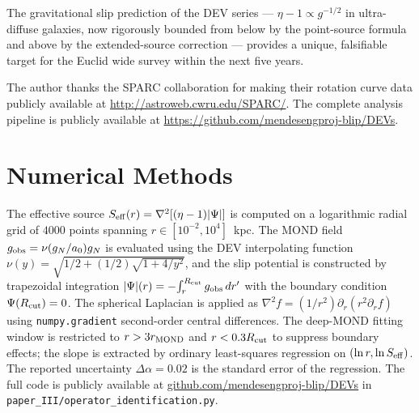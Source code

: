 \documentclass[aps,prd,twocolumn,superscriptaddress,nofootinbib]{revtex4-2}
\newcommand{\aO}{a_0}
\begin{document}
The gravitational slip prediction of the DEV series ---
$\eta-1 \propto g^{-1/2}$ in ultra-diffuse galaxies,
now rigorously bounded from below by the point-source
formula and above by the extended-source correction ---
provides a unique, falsifiable target for the Euclid
wide survey within the next five years.

\begin{acknowledgments}
The author thanks the SPARC collaboration for making their
rotation curve data publicly available at
\url{http://astroweb.cwru.edu/SPARC/}. The complete
analysis pipeline is publicly available at
\url{https://github.com/mendesengproj-blip/DEVs}.
\end{acknowledgments}

\appendix
\section{Numerical Methods}
\label{app:numerical}

The effective source $S_{\rm eff}(r) = \nabla^2[(\eta-1)|\Psi|]$
is computed on a logarithmic radial grid of $4000$ points
spanning $r \in [10^{-2},10^4]$~kpc. The MOND field
$g_{\rm obs} = \nu(g_N/\aO)g_N$ is evaluated using the
DEV interpolating function
$\nu(y) = \sqrt{1/2 + (1/2)\sqrt{1+4/y^2}}$, and the slip
potential is constructed by trapezoidal integration
$|\Psi|(r) = -\!\int_r^{R_{\rm cut}} g_{\rm obs}\,dr'$ with
the boundary condition $\Psi(R_{\rm cut})=0$. The
spherical Laplacian is applied as
$\nabla^2 f = (1/r^2)\partial_r(r^2\partial_r f)$ using
\texttt{numpy.gradient} second-order central differences.
The deep-MOND fitting window is restricted to
$r > 3 r_{\rm MOND}$ and $r < 0.3 R_{\rm cut}$ to suppress
boundary effects; the slope is extracted by ordinary
least-squares regression on $(\ln r,\ln S_{\rm eff})$.
The reported uncertainty $\Delta\alpha = 0.02$ is the
standard error of the regression. The full code is
publicly available at
\url{github.com/mendesengproj-blip/DEVs} in
\texttt{paper\_III/operator\_identification.py}.


\end{document}
